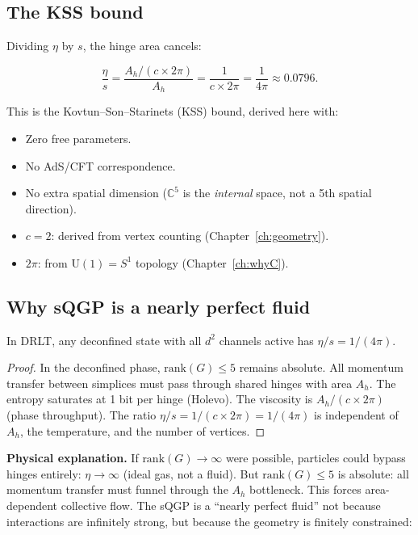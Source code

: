 \subsection{The KSS bound}

Dividing $\eta$ by $s$, the hinge area cancels:

\begin{equation}
\boxed{\frac{\eta}{s} = \frac{A_h/(c \times 2\pi)}{A_h} = \frac{1}{c \times 2\pi} = \frac{1}{4\pi} \approx 0.0796.}
\end{equation}

This is the Kovtun--Son--Starinets (KSS) bound, derived here with:
\begin{itemize}
\item Zero free parameters.
\item No AdS/CFT correspondence.
\item No extra spatial dimension ($\mathbb{C}^5$ is the \emph{internal} space, not a 5th spatial direction).
\item $c = 2$: derived from vertex counting (Chapter~\ref{ch:geometry}).
\item $2\pi$: from $\text{U}(1) = S^1$ topology (Chapter~\ref{ch:whyC}).
\end{itemize}

\subsection{Why sQGP is a nearly perfect fluid}

\begin{theorem}
In DRLT, any deconfined state with all $d^2$ channels active has $\eta/s = 1/(4\pi)$.
\end{theorem}

\begin{proof}
In the deconfined phase, $\text{rank}(G) \leq 5$ remains absolute. All momentum transfer between simplices must pass through shared hinges with area $A_h$. The entropy saturates at 1 bit per hinge (Holevo). The viscosity is $A_h/(c \times 2\pi)$ (phase throughput). The ratio $\eta/s = 1/(c \times 2\pi) = 1/(4\pi)$ is independent of $A_h$, the temperature, and the number of vertices.
\end{proof}

\textbf{Physical explanation.} If $\text{rank}(G) \to \infty$ were possible, particles could bypass hinges entirely: $\eta \to \infty$ (ideal gas, not a fluid). But $\text{rank}(G) \leq 5$ is absolute: all momentum transfer must funnel through the $A_h$ bottleneck. This forces area-dependent collective flow. The sQGP is a ``nearly perfect fluid'' not because interactions are infinitely strong, but because the geometry is finitely constrained:

